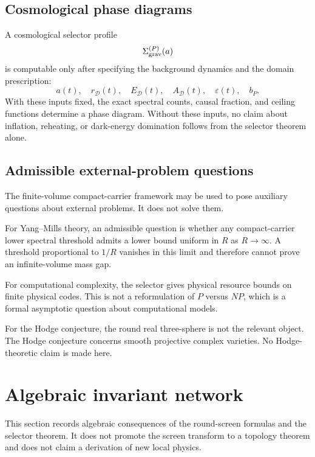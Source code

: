 \documentclass[11pt,a4paper]{article}
\begin{document}
\subsection{Cosmological phase diagrams}

A cosmological selector profile
\[
\Sigma_{\rm grav}^{(P)}(a)
\]
is computable only after specifying the background dynamics and the domain prescription:
\[
a(t),\quad r_{\mathcal D}(t),\quad E_{\mathcal D}(t),
\quad A_{\mathcal D}(t),\quad \varepsilon(t),\quad b_P.
\]
With these inputs fixed, the exact spectral counts, causal fraction, and ceiling functions determine a phase diagram.  Without these inputs, no claim about inflation, reheating, or dark-energy domination follows from the selector theorem alone.

\subsection{Admissible external-problem questions}

The finite-volume compact-carrier framework may be used to pose auxiliary questions about external problems.  It does not solve them.

For Yang--Mills theory, an admissible question is whether any compact-carrier lower spectral threshold admits a lower bound uniform in $R$ as $R\to\infty$.  A threshold proportional to $1/R$ vanishes in this limit and therefore cannot prove an infinite-volume mass gap.

For computational complexity, the selector gives physical resource bounds on finite physical codes.  This is not a reformulation of $P$ versus $NP$, which is a formal asymptotic question about computational models.

For the Hodge conjecture, the round real three-sphere is not the relevant object.  The Hodge conjecture concerns smooth projective complex varieties.  No Hodge-theoretic claim is made here.



\section{Algebraic invariant network}
\label{sec:algebraic-invariant-network}

This section records algebraic consequences of the round-screen formulas and the selector theorem.  It does not promote the screen transform to a topology theorem and does not claim a derivation of new local physics.
\end{document}

